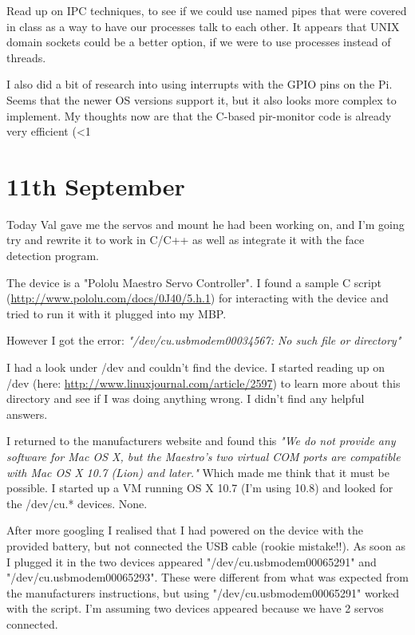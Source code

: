 Read up on IPC techniques, to see if we could use named pipes that were covered in class as a way to have our processes talk to each other. It appears that UNIX domain sockets could be a better option, if we were to use processes instead of threads.

I also did a bit of research into using interrupts with the GPIO pins on the Pi. Seems that the newer OS versions support it, but it also looks more complex to implement. My thoughts now are that the C-based pir-monitor code is already very efficient (<1%




\section*{11th September}

Today Val gave me the servos and mount he had been working on, and I'm going try and rewrite it to work in C/C++ as well as integrate it with the face detection program.

The device is a "Pololu Maestro Servo Controller". I found a sample C script (\url{http://www.pololu.com/docs/0J40/5.h.1}) for interacting with the device and tried to run it with it plugged into my MBP.

However I got the error: \textit{"/dev/cu.usbmodem00034567: No such file or directory"}

I had a look under /dev and couldn't find the device. I started reading up on /dev (here: \url{http://www.linuxjournal.com/article/2597}) to learn more about this directory and see if I was doing anything wrong. I didn't find any helpful answers.

I returned to the manufacturers website and found this \textit{"We do not provide any software for Mac OS X, but the Maestro’s two virtual COM ports are compatible with Mac OS X 10.7 (Lion) and later."} Which made me think that it must be possible. I started up a VM running OS X 10.7 (I'm using 10.8) and looked for the /dev/cu.* devices. None.

After more googling I realised that I had powered on the device with the provided battery, but not connected the USB cable (rookie mistake!!). As soon as I plugged it in the two devices appeared "/dev/cu.usbmodem00065291" and "/dev/cu.usbmodem00065293". These were different from what was expected from the manufacturers instructions, but using "/dev/cu.usbmodem00065291" worked with the script. I'm assuming two devices appeared because we have 2 servos connected.

